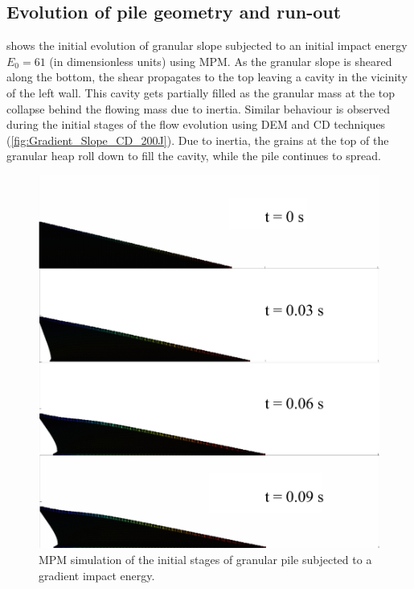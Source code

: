 \subsection{Evolution of pile geometry and run-out}
\label{sec:evolution}

 shows the initial evolution of granular 
slope subjected to an initial impact energy $E_0 = 61$ (in dimensionless units) 
using MPM. As the granular slope is sheared along the bottom, the shear 
propagates to the top leaving a cavity in the vicinity of the left wall. This 
cavity gets partially filled as the granular mass at the top collapse behind 
the flowing mass due to inertia. Similar behaviour is observed during the 
initial stages of the flow evolution using DEM and CD techniques
(\cref{fig:Gradient_Slope_CD_200J}). Due to inertia, the grains at the top 
of the granular heap roll down to fill the cavity, while the pile continues to 
spread. 

\begin{figure}[tbph]
\centering
\includegraphics[width=\textwidth]{Gradient_Slope_Profile_200J}
\caption{MPM simulation of the initial stages of granular pile subjected to a 
gradient impact 
energy.}
\label{fig:Gradient_Slope_Profile_200J}
\end{figure}


